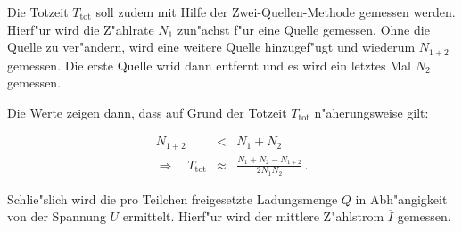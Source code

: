 		Die Totzeit $T_\mathrm{tot}$ soll zudem mit Hilfe der Zwei-Quellen-Methode gemessen werden.
		Hierf"ur wird die Z"ahlrate $N_1$ zun"achst f"ur eine Quelle gemessen.
		Ohne die Quelle zu ver"andern, wird eine weitere Quelle hinzugef"ugt und wiederum $N_{1+2}$ gemessen.
		Die erste Quelle wrid dann entfernt und es wird ein letztes Mal $N_2$ gemessen.

		Die Werte zeigen dann, dass auf Grund der Totzeit $T_\mathrm{tot}$ n"aherungsweise gilt: 

		\begin{eqnarray}
			N_{1+2} & < & N_1 + N_2 \nonumber \\
			\Rightarrow \quad T_\mathrm{tot} & \approx & \frac{N_1 + N_2 - N_{1+2}}{2 N_1 N_2} \label{totzeit} \,.
		\end{eqnarray}


		Schlie"slich wird die pro Teilchen freigesetzte Ladungsmenge $Q$ in Abh"angigkeit von der Spannung $U$ ermittelt.
		Hierf"ur wird der mittlere Z"ahlstrom $\overline{I}$ gemessen.